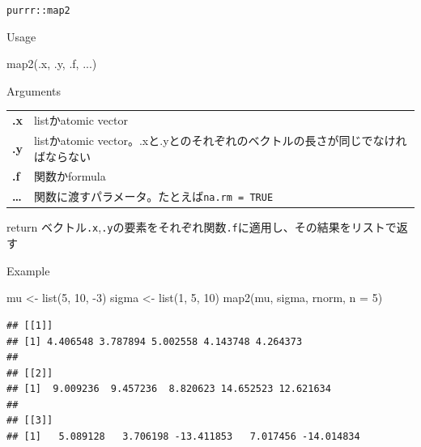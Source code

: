 \documentclass[
  ignorenonframetext,
  aspectratio=169]{beamer}
\newenvironment{Shaded}{\begin{snugshade}}{\end{snugshade}}
\newcommand{\AttributeTok}[1]{\textcolor[rgb]{0.77,0.63,0.00}{#1}}
\newcommand{\DecValTok}[1]{\textcolor[rgb]{0.00,0.00,0.81}{#1}}
\newcommand{\FunctionTok}[1]{\textcolor[rgb]{0.00,0.00,0.00}{#1}}
\newcommand{\NormalTok}[1]{#1}
\newcommand{\OtherTok}[1]{\textcolor[rgb]{0.56,0.35,0.01}{#1}}
\newcommand{\SpecialCharTok}[1]{\textcolor[rgb]{0.00,0.00,0.00}{#1}}
\begin{document}
\begin{frame}[fragile]{\texttt{purrr::map2}}
\protect\hypertarget{purrrmap2}{}
\begin{block}{Usage}
\protect\hypertarget{usage-1}{}
\begin{Shaded}
\begin{Highlighting}[]
\FunctionTok{map2}\NormalTok{(.x, .y, .f, ...)}
\end{Highlighting}
\end{Shaded}
\end{block}

\begin{block}{Arguments}
\protect\hypertarget{arguments-1}{}
\begin{longtable}[]{@{}
  >{\raggedright\arraybackslash}p{}
  >{\raggedright\arraybackslash}p{}@{}}
\toprule()
\endhead
\textbf{.x} & listかatomic vector \\
\textbf{.y} & listかatomic
vector。.xと.yとのそれぞれのベクトルの長さが同じでなければならない \\
\textbf{.f} & 関数かformula \\
\textbf{\ldots{}} &
関数に渡すパラメータ。たとえば\texttt{na.rm\ =\ TRUE} \\
\bottomrule()
\end{longtable}
\end{block}

\begin{block}{return}
\protect\hypertarget{return-1}{}
ベクトル\texttt{.x},\texttt{.y}の要素をそれぞれ関数\texttt{.f}に適用し、その結果をリストで返す
\end{block}
\end{frame}

\begin{frame}[fragile]{Example}
\protect\hypertarget{example}{}
\begin{Shaded}
\begin{Highlighting}[]
\NormalTok{mu }\OtherTok{\textless{}{-}} \FunctionTok{list}\NormalTok{(}\DecValTok{5}\NormalTok{, }\DecValTok{10}\NormalTok{, }\SpecialCharTok{{-}}\DecValTok{3}\NormalTok{)}
\NormalTok{sigma }\OtherTok{\textless{}{-}} \FunctionTok{list}\NormalTok{(}\DecValTok{1}\NormalTok{, }\DecValTok{5}\NormalTok{, }\DecValTok{10}\NormalTok{)}
\FunctionTok{map2}\NormalTok{(mu, sigma, rnorm, }\AttributeTok{n =} \DecValTok{5}\NormalTok{)}
\end{Highlighting}
\end{Shaded}

\begin{verbatim}
## [[1]]
## [1] 4.406548 3.787894 5.002558 4.143748 4.264373
## 
## [[2]]
## [1]  9.009236  9.457236  8.820623 14.652523 12.621634
## 
## [[3]]
## [1]   5.089128   3.706198 -13.411853   7.017456 -14.014834
\end{verbatim}
\end{frame}
\end{document}
